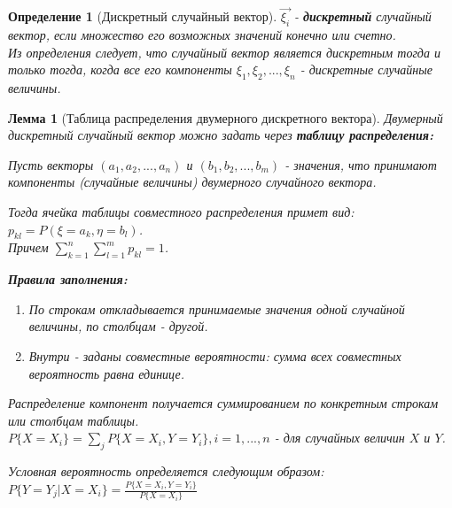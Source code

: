 \documentclass[14pt]{extarticle}
\theoremstyle{breakstyle}
\newtheorem{definition}{Определение}[subsection]
\newtheorem{lemma}{Лемма}[subsection]
\begin{document}
\begin{definition}[Дискретный случайный вектор]

$\vec{\xi_{i}}$ - \textbf{дискретный} случайный вектор, если множество его возможных значений конечно или счетно.\\
Из определения следует, что случайный вектор является дискретным тогда и только тогда, когда все его компоненты $\xi_{1}, \xi_{2}, ..., \xi_{n}$ - дискретные случайные величины.

\end{definition}

\begin{lemma}[Таблица распределения двумерного дискретного вектора]

Двумерный дискретный случайный вектор можно задать через \textbf{таблицу распределения:}

\vspace{\baselineskip}

Пусть векторы $(a_{1}, a_{2}, ..., a_{n})$ и $(b_{1}, b_{2}, ..., b_{m})$ - значения, что принимают компоненты (случайные величины) двумерного случайного вектора.

\vspace{\baselineskip}

Тогда ячейка таблицы совместного распределения примет вид: $p_{kl} = P(\xi = a_{k}, \eta = b_{l})$. \\
Причем $\sum_{k=1}^{n} \sum_{l=1}^{m} p_{kl} = 1$.

\vspace{\baselineskip}

\textbf{Правила заполнения:}
\begin{enumerate}
    \item По строкам откладывается принимаемые значения одной случайной величины, по столбцам - другой.
    \item Внутри - заданы совместные вероятности: сумма всех совместных вероятность равна единице.
\end{enumerate}

\vspace{\baselineskip}

Распределение компонент получается суммированием по конкретным строкам или столбцам таблицы. \\
$P\{X=X_{i}\} = \sum_{j}P\{X=X_{i}, Y=Y_{i}\}, i=1, ..., n$ - для случайных величин $X$ и $Y$.

\vspace{\baselineskip}

Условная вероятность определяется следующим образом:\\
$P\{Y=Y_{j} \text{|} X = X_{i}\} = \frac{P\{X=X_{i}, Y=Y_{i}\}}{P\{X=X_{i}\}}$

\end{lemma}
\end{document}
